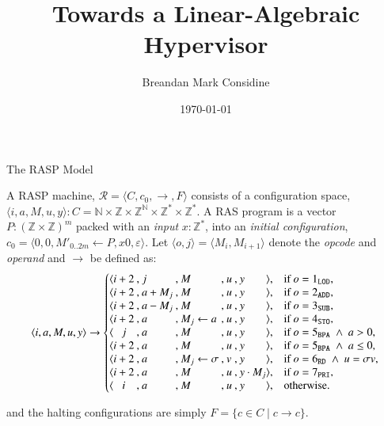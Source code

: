 \documentclass{beamer}
\title{Towards a Linear-Algebraic Hypervisor}
\author{Breandan Mark Considine}
\date{\today}
\begin{document}
\begin{frame}
  \titlepage
\end{frame}

\begin{frame}{The RASP Model}
  \vspace{-0.4cm}
  \begin{definition}
  A RASP machine, \(\mathcal{R} = \langle C,c_0,\to,F\rangle\) consists of a configuration space, \( \langle i,a,M,u,y\rangle: C=\mathbb N\times\mathbb Z\times\mathbb Z^{\mathbb N}\times\mathbb Z^*\times\mathbb Z^* \). A RAS program is a vector \(P: (\mathbb Z\times\mathbb Z)^m\) packed with an \textit{input} \(x: \mathbb{Z}^*\), into an \textit{initial configuration}, \(c_0=\big\langle 0,0,M'_{0..2m} \gets P,x0,\varepsilon \big\rangle.\)
  Let \(\langle o,j\rangle=\langle M_i,M_{i+1}\rangle\) denote the \textit{opcode} and \textit{operand} and $\rightarrow$ be defined as:
  {\small
  \[
  \langle i,a,M,u,y\rangle \rightarrow
  \left\{
    \begin{array}{@{}c@{}c@{\:,\:}l@{\:,\:}l@{\:,\:}l@{\:,\:}l@{}c@{\quad}l@{}}
      \langle & i+2 & j     & M               & u & y          & \rangle, & \text{if } o=1_{\mathtt{LOD}},\\
      \langle & i+2 & a+M_j & M               & u & y          & \rangle, & \text{if } o=2_{\mathtt{ADD}},\\
      \langle & i+2 & a-M_j & M               & u & y          & \rangle, & \text{if } o=3_{\mathtt{SUB}},\\
      \langle & i+2 & a     & M_j\gets a      & u & y          & \rangle, & \text{if } o=4_{\mathtt{STO}},\\
      \langle & j   & a     & M               & u & y          & \rangle, & \text{if } o=5_{\mathtt{BPA}}\ \wedge\ a>0,\\
      \langle & i+2 & a     & M               & u & y          & \rangle, & \text{if } o=5_{\mathtt{BPA}}\ \wedge\ a\le 0,\\
      \langle & i+2 & a     & M_j\gets \sigma & v & y          & \rangle, & \text{if } o=6_{\mathtt{RD}}\ \wedge\ u=\sigma v,\\
      \langle & i+2 & a     & M               & u & y\cdot M_j & \rangle, & \text{if } o=7_{\mathtt{PRI}},\\
      \langle & i   & a     & M               & u & y          & \rangle, & \text{otherwise.}
    \end{array}
  \right.
  \]
  }

  and the halting configurations are simply \( F= \{c \in C \mid c \rightarrow c\}\).
    \end{definition}

\end{frame}
\end{document}
